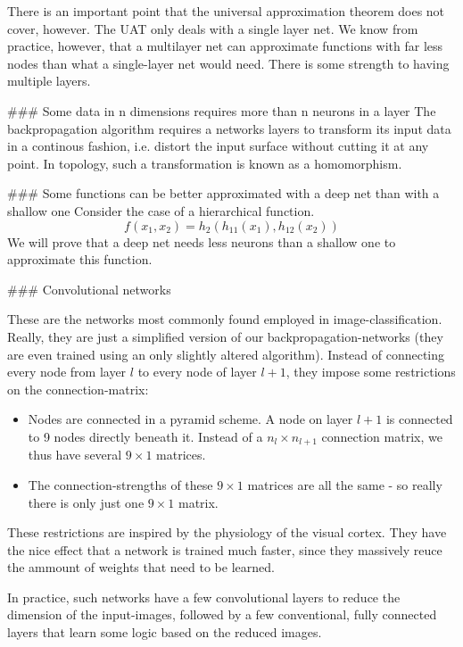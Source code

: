 There is an important point that the universal approximation theorem does not cover, however. The UAT only deals with a single layer net. We know from practice, however, that a multilayer net can approximate functions with far less nodes than what a single-layer net would need. There is some strength to having multiple layers.



### Some data in n dimensions requires more than n neurons in a layer
The backpropagation algorithm requires a networks layers to transform its input data in a continous fashion, i.e. distort the input surface without cutting it at any point. In topology, such a transformation is known as a homomorphism.  

### Some functions can be better approximated with a deep net than with a shallow one
Consider the case of a hierarchical function. 
$$ f(x_1, x_2) = h_2( h_11(x_1), h_12(x_2))$$
We will prove that a deep net needs less neurons than a shallow one to approximate this function.





### Convolutional networks

These are the networks most commonly found employed in image-classification. Really, they are just a simplified version of our backpropagation-networks (they are even trained using an only slightly altered algorithm). Instead of connecting every node from layer $l$ to every node of layer $l+1$, they impose some restrictions on the connection-matrix:
\begin{itemize}
	\item Nodes are connected in a pyramid scheme. A node on layer $l+1$ is connected to 9 nodes directly beneath it. Instead of a $n_l \times n_{l+1}$ connection matrix, we thus have several $9 \times 1$ matrices.
	\item The connection-strengths of these  $9 \times 1$ matrices are all the same - so really there is only just one  $9 \times 1$ matrix. 
\end{itemize}
These restrictions are inspired by the physiology of the visual cortex. They have the nice effect that a network is trained much faster, since they massively reuce the ammount of weights that need to be learned. 

In practice, such networks have a few convolutional layers to reduce the dimension of the input-images, followed by a few conventional, fully connected layers that learn some logic based on the reduced images. 

